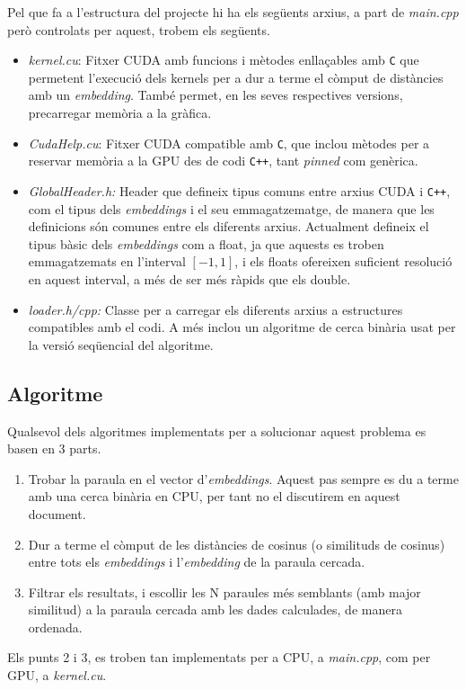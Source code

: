 \documentclass[catalan,10pt,a4paper]{article}
\begin{document}
Pel que fa a l'estructura del projecte hi ha els següents arxius, a part de \textit{main.cpp} però controlats per aquest, trobem els següents.
\begin{itemize}
	\item \textit{kernel.cu}: Fitxer CUDA amb funcions i mètodes enllaçables amb \verb|C| que permetent l'execució dels kernels per a dur a terme el còmput de distàncies amb un \textit{embedding}. També permet, en les seves respectives versions, precarregar memòria a la gràfica.
	\item \textit{CudaHelp.cu}: Fitxer CUDA compatible amb \verb|C|, que inclou mètodes per a reservar memòria a la GPU des de codi \verb|C++|, tant \textit{pinned} com genèrica.
	\item \textit{GlobalHeader.h:} Header que defineix tipus comuns entre arxius CUDA i \verb|C++|, com el tipus dels \textit{embeddings} i el seu emmagatzematge, de manera que les definicions són comunes entre els diferents arxius. Actualment defineix el tipus bàsic dels \textit{embeddings} com a float, ja que aquests es troben emmagatzemats en l'interval $[-1,1]$, i els floats ofereixen suficient resolució en aquest interval, a més de ser més ràpids que els double.
	\item \textit{loader.h/cpp:} Classe per a carregar els diferents arxius a estructures compatibles amb el codi. A més inclou un algoritme de cerca binària usat per la versió seqüencial del algoritme.
\end{itemize}
\subsection*{Algoritme}
Qualsevol dels algoritmes implementats per a solucionar aquest problema es basen en 3 parts.
\begin{enumerate}
	\item Trobar la paraula en el vector d'\textit{embeddings}. Aquest pas sempre es du a terme amb una cerca binària en CPU, per tant no el discutirem en aquest document.
	\item Dur a terme el còmput de les distàncies de cosinus (o similituds de cosinus) entre tots els \textit{embeddings} i l'\textit{embedding} de la paraula cercada.
	\item Filtrar els resultats, i escollir les N paraules més semblants (amb major similitud) a la paraula cercada amb les dades calculades, de manera ordenada.
\end{enumerate}
Els punts 2 i 3, es troben tan implementats per a CPU, a \textit{main.cpp}, com per GPU, a \textit{kernel.cu}.
\end{document}
